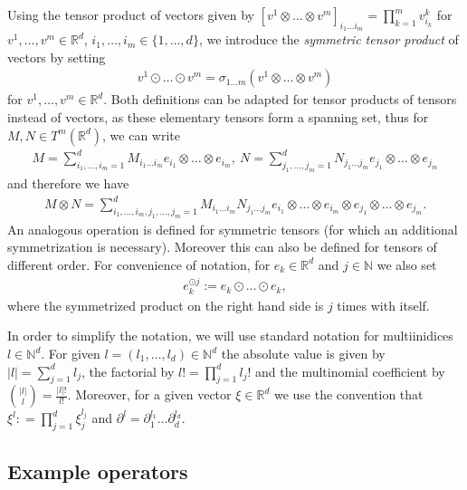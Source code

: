 \documentclass[a4paper, 10pt, twoside, notitlepage]{amsart}
\theoremstyle{plain}
\newcommand{\R}{\mathbb{R}}
\newcommand{\N}{\mathbb{N}}
\newcommand{\p}{\partial}
\begin{document}
	
	Using the tensor product of vectors given by $[v^1 \otimes \dots \otimes v^m]_{i_1 \dots i_m} = \prod_{k=1}^m v^k_{i_k}$ for $v^1,\dots,v^m \in \R^d$, $i_1, \dots, i_m \in \{1,\dots,d\}$, we introduce the \emph{symmetric tensor product} of vectors by setting
	\begin{align}
		\label{eq:sym_prod}
		v^1 \odot \dots \odot v^m = \sigma_{1 \dots m} ( v^1 \otimes \dots \otimes v^m)
	\end{align}
	for $v^1,\dots, v^m \in \R^d$.
        Both definitions can be adapted for tensor products of tensors instead of vectors, as these elementary tensors form a spanning set, thus for $M,N \in T^m(\R^d)$, we can write
          \begin{align*}
            M = \sum_{i_1,\dots,i_m=1}^d M_{i_1 \dots i_m} e_{i_1} \otimes \dots \otimes e_{i_m}, \ N = \sum_{j_1, \dots, j_m = 1}^d N_{j_1 \dots j_m} e_{j_1} \otimes \dots \otimes e_{j_m}
          \end{align*}
          and therefore we have
          \begin{align*}
            M \otimes N = \sum_{i_1,\dots,i_m,j_1,\dots,j_m=1}^d M_{i_1 \dots i_m} N_{j_1 \dots j_m} e_{i_1} \otimes \dots \otimes e_{i_m} \otimes e_{j_1} \otimes \dots \otimes e_{j_m}.
          \end{align*}
          An analogous operation is defined for symmetric tensors (for which an additional symmetrization is necessary).
          Moreover this can also be defined for tensors of different order.
        For convenience of notation, for $e_k \in \R^d$ and $j \in \N$ we also set
        \begin{align*}
        e_k^{\odot j}:= e_k \odot \dots \odot  e_k,
        \end{align*}
        where the symmetrized product on the right hand side is $j$ times with itself.

        
          In order to simplify the notation, we will use standard notation for multiinidices $l \in \N^d$.
          For given $l =(l_1,\dots,l_d)\in \N^d$ the absolute value is given by $|l| = \sum_{j=1}^d l_j$, the factorial by $l! = \prod_{j=1}^d l_j!$ and the multinomial coefficient by $\binom{|l|}{l} = \frac{|l|!}{l!}$.
          Moreover, for a given vector $\xi \in \R^d$ we use the convention that $\xi^l: = \prod_{j=1}^d \xi_j^{l_j}$ and $\p^l = \p_1^{l_1} \dots \p_d^{l_d}$.
          
	\subsection{Example operators}
	\label{sec:Saint_venant}
	
\end{document}
